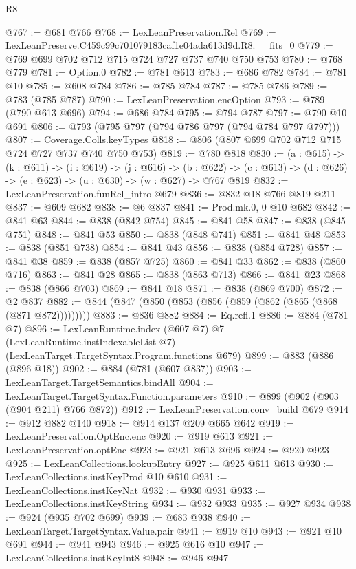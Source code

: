 \begin{lexlean}{R8}
\begin{coremodule}
@767 := @681 @766
@768 := LexLeanPreservation.Rel
@769 := LexLeanPreserve.C459c99c701079183caf1e04ada613d9d.R8.__fits_0
@779 := @769 @699 @702 @712 @715 @724 @727 @737 @740 @750 @753
@780 := @768 @779
@781 := Option.{0}
@782 := @781 @613
@783 := @686 @782
@784 := @781 @10
@785 := @608 @784
@786 := @785 @784
@787 := @785 @786
@789 := @783 (@785 @787)
@790 := LexLeanPreservation.encOption
@793 := @789 (@790 @613 @696)
@794 := @686 @784
@795 := @794 @787
@797 := @790 @10 @691
@806 := @793 (@795 @797 (@794 @786 @797 (@794 @784 @797 @797)))
@807 := Coverage.Colls.keyTypes
@818 := @806 (@807 @699 @702 @712 @715 @724 @727 @737 @740 @750 @753)
@819 := @780 @818
@830 := (a : @615) ->
  (k : @611) ->
  (i : @619) ->
  (j : @616) ->
  (b : @622) -> (c : @613) -> (d : @626) -> (e : @623) -> (u : @630) -> (w : @627) -> @767 @819
@832 := LexLeanPreservation.funRel_intro @679
@836 := @832 @18 @766 @819 @211
@837 := @609 @682
@838 := @6 @837
@841 := Prod.mk.{0, 0} @10 @682
@842 := @841 @63
@844 := @838 (@842 @754)
@845 := @841 @58
@847 := @838 (@845 @751)
@848 := @841 @53
@850 := @838 (@848 @741)
@851 := @841 @48
@853 := @838 (@851 @738)
@854 := @841 @43
@856 := @838 (@854 @728)
@857 := @841 @38
@859 := @838 (@857 @725)
@860 := @841 @33
@862 := @838 (@860 @716)
@863 := @841 @28
@865 := @838 (@863 @713)
@866 := @841 @23
@868 := @838 (@866 @703)
@869 := @841 @18
@871 := @838 (@869 @700)
@872 := @2 @837
@882 := @844 (@847 (@850 (@853 (@856 (@859 (@862 (@865 (@868 (@871 @872)))))))))
@883 := @836 @882
@884 := Eq.refl.{1}
@886 := @884 (@781 @7)
@896 := LexLeanRuntime.index
    (@607 @7)
    @7
    (LexLeanRuntime.instIndexableList @7)
    (LexLeanTarget.TargetSyntax.Program.functions @679)
@899 := @883 (@886 (@896 @18))
@902 := @884 (@781 (@607 @837))
@903 := LexLeanTarget.TargetSemantics.bindAll
@904 := LexLeanTarget.TargetSyntax.Function.parameters
@910 := @899 (@902 (@903 (@904 @211) @766 @872))
@912 := LexLeanPreservation.conv_build @679
@914 := @912 @882 @140
@918 := @914 @137 @209 @665 @642
@919 := LexLeanPreservation.OptEnc.enc
@920 := @919 @613
@921 := LexLeanPreservation.optEnc
@923 := @921 @613 @696
@924 := @920 @923
@925 := LexLeanCollections.lookupEntry
@927 := @925 @611 @613
@930 := LexLeanCollections.instKeyProd @10 @610
@931 := LexLeanCollections.instKeyNat
@932 := @930 @931
@933 := LexLeanCollections.instKeyString
@934 := @932 @933
@935 := @927 @934
@938 := @924 (@935 @702 @699)
@939 := @683 @938
@940 := LexLeanTarget.TargetSyntax.Value.pair
@941 := @919 @10
@943 := @921 @10 @691
@944 := @941 @943
@946 := @925 @616 @10
@947 := LexLeanCollections.instKeyInt8
@948 := @946 @947

\end{coremodule}
\end{lexlean}
